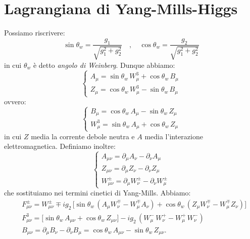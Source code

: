 \section{Lagrangiana di Yang-Mills-Higgs}

Possiamo riscrivere:
\begin{equation}
    \sin\theta_w = \frac{g_1}{\sqrt{g_1^2 + g_2^2}} \quad , \quad \cos\theta_w = \frac{g_2}{\sqrt{g_1^2 + g_2^2}}
\end{equation}
in cui $\theta_w$ è detto \textit{angolo di Weinberg}. Dunque abbiamo:
\begin{equation}
    \begin{cases}
        A_\mu = \sin\theta_w\, W_\mu^3 + \cos\theta_w\, B_\mu \\
        Z_\mu = \cos\theta_w\, W_\mu^3 - \sin\theta_w\, B_\mu
    \end{cases}
\end{equation}
ovvero:
\begin{equation}
    \begin{cases}
        B_\mu = \cos\theta_w\, A_\mu - \sin\theta_w\, Z_\mu \\
        W_\mu^3 = \sin\theta_w\, A_\mu + \cos\theta_w\, Z_\mu
    \end{cases}
\end{equation}
in cui $Z$ media la corrente debole neutra e $A$ media l'interazione elettromagnetica. Definiamo inoltre:
\begin{equation}
    \begin{cases}
        A_{\mu\nu} = \partial_\mu A_\nu - \partial_\nu A_\mu \\
        Z_{\mu\nu} = \partial_\mu Z_\nu - \partial_\nu Z_\mu \\
        W_{\mu\nu}^\pm = \partial_\mu W_\nu^\pm - \partial_\nu W_\mu^\pm
    \end{cases}
\end{equation}
che sostituiamo nei termini cinetici di Yang-Mills. Abbiamo:
\begin{align}
    &F_{\mu\nu}^\pm = W_{\mu\nu}^\pm \mp ig_2\, \Big[ \sin\theta_w\, \left(A_\mu W_\nu^\mp - W_\mu^\mp A_\nu \right) + \cos\theta_w\, \left(Z_\mu W_\nu^\mp - W_\mu^\mp Z_\nu \right) \Big] \\
    &F_{\mu\nu}^3 = \Big[ \sin\theta_w\, A_{\mu\nu} + \cos\theta_w\, Z_{\mu\nu} \Big] - ig_2\, \left( W_\mu^-\, W_\nu^+ - W_\mu^+\, W_\nu^- \right) \\
    &B_{\mu\nu} = \partial_\mu B_\nu - \partial_\nu B_\mu = \cos\theta_w\, A_{\mu\nu} - \sin\theta_w\, Z_{\mu\nu}.
\end{align}
